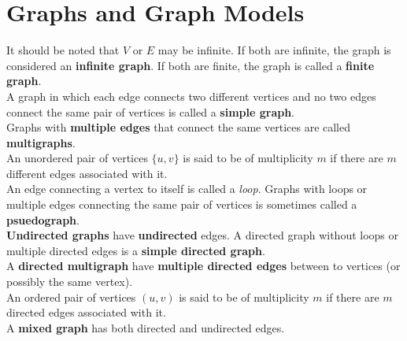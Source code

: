 \documentclass[./Discrete Math.tex]{subfiles}
\begin{document}
	\section{Graphs and Graph Models}
		It should be noted that \(V\) or \(E\) may be infinite. If both are infinite, the graph is considered an \textbf{infinite graph}. If both are finite, the graph is called a \textbf{finite graph}. \\
		A graph in which each edge connects two different vertices and no two edges connect the same pair of vertices is called a \textbf{simple graph}. \\
		Graphs with \textbf{multiple edges} that connect the same vertices are called \textbf{multigraphs}. \\
		An unordered pair of vertices \(\{u, v\}\) is said to be of multiplicity \(m\) if there are \(m\) different edges associated with it. \\
		An edge connecting a vertex to itself is called a \textit{loop}.
		Graphs with loops or multiple edges connecting the same pair of vertices is sometimes called a \textbf{psuedograph}. \\
		\textbf{Undirected graphs} have \textbf{undirected} edges.
		A directed graph without loops or multiple directed edges is a \textbf{simple directed graph}. \\
		A \textbf{directed multigraph} have \textbf{multiple directed edges} between to vertices (or possibly the same vertex). \\
		An ordered pair of vertices \((u, v)\) is said to be of multiplicity \(m\) if there are \(m\) directed edges associated with it. \\
		A \textbf{mixed graph} has both directed and undirected edges. \\
		
\end{document}
